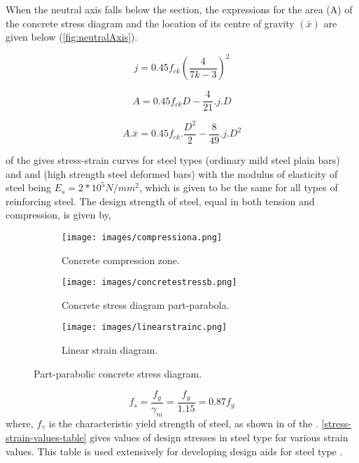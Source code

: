 When the neutral axis falls below the section, the expressions for the
area (A) of the concrete stress diagram and the location of its centre
of gravity $(\bar x)$ are given below (\fig \ref{fig:neutralAxis}).

\begin{equation}
j=0.45f_{ck}\left(\frac{4}{7k-3}\right)^2
\end{equation}

\begin{equation}
A=0.45f_{ck}D-\frac{4}{21}.j.D
\end{equation}

\begin{equation}
A.\bar{x}=0.45f_{ck}.\frac{D^2}{2}-\frac{8}{49}.j.D^2
\end{equation}


 of the  gives stress-strain curves for
steel types  (ordinary mild steel plain bars) and {\fefouronefive} and
{\fefivezerozero} (high strength steel deformed bars) with the modulus
of elasticity of steel being $E_s = 2*10^5 N/mm^2$, which is given to be
the same for all types of reinforcing steel. The design strength of
steel, equal in both tension and compression, is given by,
\begin{figure}
\begin{subfigure}{0.3\textwidth}
\centering
\texttt{[image: images/compressiona.png]}
\caption{Concrete compression zone.}
\label{fig:compression}
\end{subfigure}
%
\begin{subfigure}{0.3\textwidth}
\centering
\texttt{[image: images/concretestressb.png]}
\caption{Concrete stress diagram part-parabola.}
\label{fig:stress}
\end{subfigure}
%
\begin{subfigure}{0.3\textwidth}
\centering
\texttt{[image: images/linearstrainc.png]}
\caption{Linear strain diagram.}
\label{fig:strain}
\end{subfigure}
\caption{Part-parabolic concrete stress diagram.}
\label{Part-ConcreteStressDiagram}
\end{figure}
\begin{equation}
f_s=\frac{f_y}{\gamma_m}=\frac{f_y}{1.15}=0.87f_y
\end{equation}
where, $f_\gamma$ is the characteristic yield strength of steel, as shown in
 of the . \tablem \ref{stress-strain-values-table}
gives values of design stresses in steel type {\fefouronefive}
for various strain values. This table is used extensively for developing
design aids for steel type {\fefouronefive}. 

